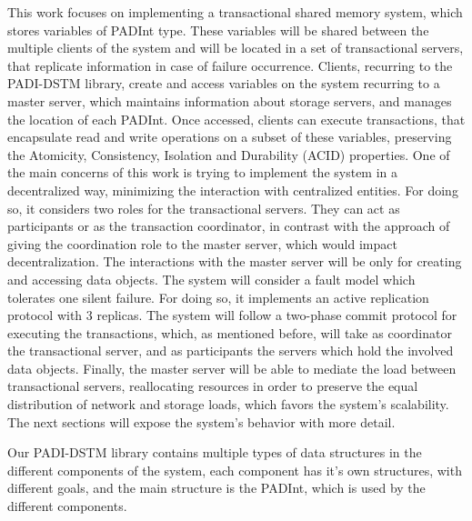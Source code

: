 \documentclass[times, 10pt,twocolumn]{article}
\begin{document}
This work focuses on implementing a transactional shared memory system, which stores variables of PADInt type. These variables will be shared between the multiple clients of the system and will be located in a set of transactional servers, that replicate information in case of failure occurrence. Clients, recurring to the PADI-DSTM library, create and access variables on the system recurring to a master server, which maintains information about storage servers, and manages the location of each PADInt. Once accessed, clients can execute transactions, that encapsulate read and write operations on a subset of these variables, preserving the Atomicity, Consistency, Isolation and Durability (ACID) properties. One of the main concerns of this work is trying to implement the system in a decentralized way, minimizing the interaction with centralized entities. For doing so, it considers two roles for the transactional servers. They can act as participants or as the transaction coordinator, in contrast with the approach of giving the coordination role to the master server, which would impact decentralization. The interactions with the master server will be only for creating and accessing data objects. The system will consider a fault model which tolerates one silent failure. For doing so, it implements an active replication protocol with 3 replicas. The system will follow a two-phase commit protocol for executing the transactions, which, as mentioned before, will take as coordinator the transactional server, and as participants the servers which hold the involved data objects. Finally, the master server will be able to mediate the load between transactional servers, reallocating resources in order to preserve the equal distribution of network and storage loads, which favors the system's scalability. The next sections will expose the system's behavior with more detail.


Our PADI-DSTM library contains multiple types of data structures in the different components of the system, each component has it's own structures, with different goals, and the main structure is the PADInt, which is used by the different components.
\end{document}
